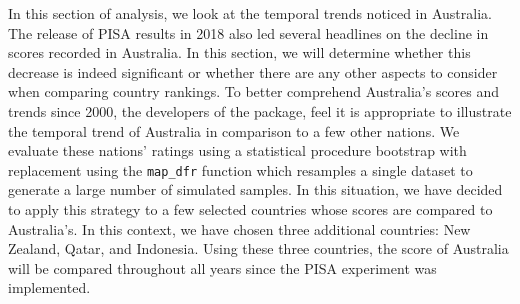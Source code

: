 In this section of analysis, we look at the temporal trends noticed in
Australia. The release of PISA results in 2018 also led several
headlines on the decline in scores recorded in Australia. In this
section, we will determine whether this decrease is indeed significant
or whether there are any other aspects to consider when comparing
country rankings. To better comprehend Australia's scores and trends
since 2000, the developers of the  package, feel
it is appropriate to illustrate the temporal trend of Australia in
comparison to a few other nations. We evaluate these nations' ratings
using a statistical procedure bootstrap with replacement using the
\texttt{map\_dfr} function which resamples a single dataset to generate
a large number of simulated samples. In this situation, we have decided
to apply this strategy to a few selected countries whose scores are
compared to Australia's. In this context, we have chosen three
additional countries: New Zealand, Qatar, and Indonesia. Using these
three countries, the score of Australia will be compared throughout all
years since the PISA experiment was implemented.

